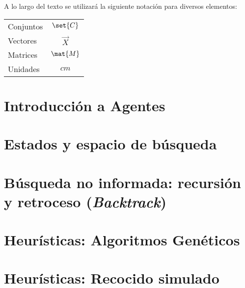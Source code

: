 \documentclass[12pt,openany]{book}
\begin{document}
A lo largo del texto se utilizará la siguiente notación para diversos elementos:
\begin{longtable}{lc}
 Conjuntos   &   $\set{C}$ \\
 Vectores    &   $\vec{X}$ \\
 Matrices    &   $\mat{M}$ \\
 Unidades    &   $\unit{cm}$
\end{longtable}



\chapter{Introducción a Agentes}





\chapter{Estados y espacio de búsqueda}





\chapter[Retroceso]{Búsqueda no informada: recursión y retroceso (\textit{Backtrack})}





\chapter{Heurísticas: Algoritmos Genéticos}





\chapter{Heurísticas: Recocido simulado}
\end{document}

